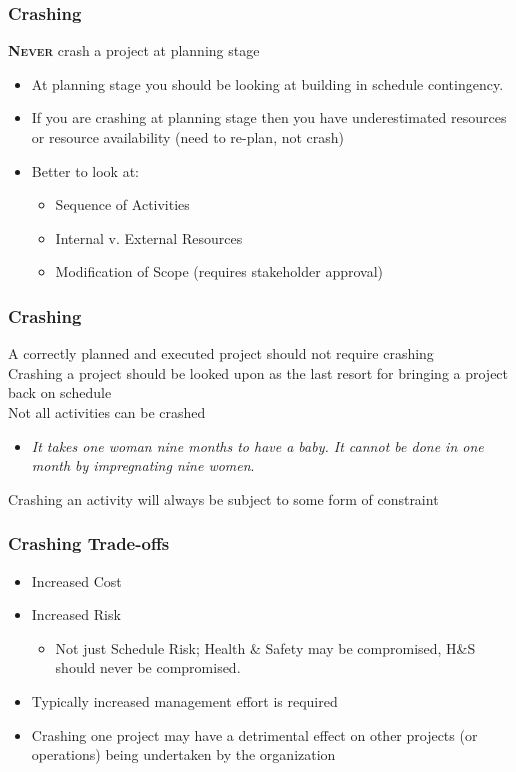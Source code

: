 \begin{frame}
\frametitle{Crashing}
\textsc{\textbf{Never}} crash a project at planning stage
\begin{itemize}
	\item At planning stage you should be looking at building in schedule contingency.
	\item If you are crashing at planning stage then you have underestimated resources or resource availability (need to re-plan, not crash)
	\item Better to look at: 
		\begin{itemize}
			\item Sequence of Activities
			\item Internal v. External Resources
			\item Modification of Scope (requires stakeholder approval)
		\end{itemize}
\end{itemize}
\end{frame}




\begin{frame}
\frametitle{Crashing}
A correctly planned and executed project should not require crashing\\
Crashing a project should be looked upon as the last resort for bringing a project back on schedule\\
Not all activities can be crashed
\begin{itemize}
	\item \textit{It takes one woman nine months to have a baby. It cannot be done in one month by impregnating nine women}. 
\end{itemize}
Crashing an activity will always be subject to some form of constraint
\end{frame}




\begin{frame}
\frametitle{Crashing \hfill Trade-offs}
\begin{itemize}
	\item Increased Cost\\
	\item Increased Risk
		\begin{itemize}
			\item Not just Schedule Risk; Health \& Safety may be compromised, H\&S should never be compromised.
		\end{itemize}
	\item Typically increased management effort is required\\
	\item Crashing one project may have a detrimental effect on other projects (or operations) being undertaken by the organization
\end{itemize}
\end{frame}



